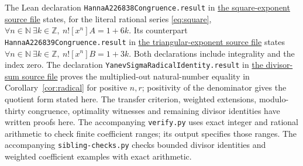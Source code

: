\documentclass[11pt]{article}
\begin{document}
The Lean declaration \texttt{HannaA226838Congruence.result}
in \href{https://github.com/the-omega-institute/trureturing/blob/6974dba01daa1a25cc74b87a86c191e95fe2c681/D5/S1/Recurrence/Residue/HannaA226838Congruence.lean}{the square-exponent source file}
states, for the literal rational series \eqref{eq:square},
$\forall n\in\mathbb N\ \exists k\in\mathbb Z,\ n![x^n]A=1+6k$.
Its counterpart \texttt{HannaA226839Congruence.result} in
\href{https://github.com/the-omega-institute/trureturing/blob/6974dba01daa1a25cc74b87a86c191e95fe2c681/D5/S1/Recurrence/Residue/HannaA226839Congruence.lean}{the triangular-exponent source file}
states $\forall n\in\mathbb N\ \exists k\in\mathbb Z,\ n![x^n]B=1+3k$.
Both declarations include integrality and the index zero.
The declaration \texttt{YanevSigmaRadicalIdentity.result} in
\href{https://github.com/the-omega-institute/trureturing/blob/6974dba01daa1a25cc74b87a86c191e95fe2c681/D5/S3/Arith/YanevSigmaRadicalIdentity.lean}{the divisor-sum source file}
proves the multiplied-out natural-number equality in
Corollary~\ref{cor:radical} for positive $n,r$; positivity of the denominator
gives the quotient form stated here.
The transfer criterion, weighted extensions, modulo-thirty congruence,
optimality witnesses and remaining divisor identities have written proofs here.
The accompanying \texttt{verify.py} uses exact integer and rational
arithmetic to check finite coefficient ranges; its output specifies those ranges.
The accompanying \texttt{sibling-checks.py} checks bounded divisor identities
and weighted coefficient examples with exact arithmetic.
\end{document}
